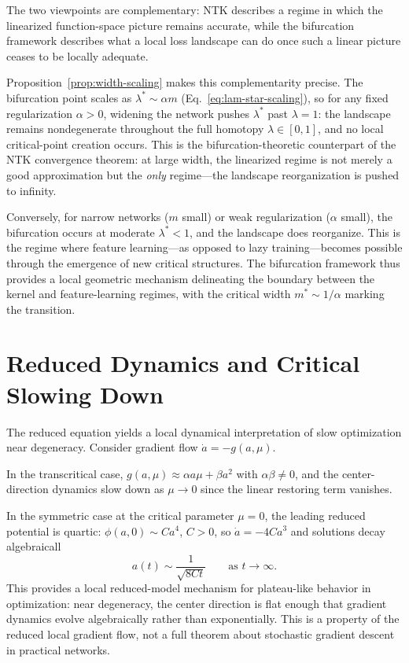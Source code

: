 \documentclass[11pt, reqno]{amsart}
\theoremstyle{plain}
\theoremstyle{definition}
\theoremstyle{remark}
\begin{document}
The two viewpoints are complementary: NTK describes a regime in which the linearized function-space picture remains accurate, while the bifurcation framework describes what a local loss landscape can do once such a linear picture ceases to be locally adequate.

Proposition~\ref{prop:width-scaling} makes this complementarity precise.  The bifurcation point scales as $\lambda^*\sim\alpha m$ (Eq.~\ref{eq:lam-star-scaling}), so for any fixed regularization $\alpha>0$, widening the network pushes $\lambda^*$ past $\lambda=1$: the landscape remains nondegenerate throughout the full homotopy $\lambda\in[0,1]$, and no local critical-point creation occurs.  This is the bifurcation-theoretic counterpart of the NTK convergence theorem: at large width, the linearized regime is not merely a good approximation but the \emph{only} regime---the landscape reorganization is pushed to infinity.

Conversely, for narrow networks ($m$ small) or weak regularization ($\alpha$ small), the bifurcation occurs at moderate $\lambda^*<1$, and the landscape does reorganize.  This is the regime where feature learning---as opposed to lazy training---becomes possible through the emergence of new critical structures.  The bifurcation framework thus provides a local geometric mechanism delineating the boundary between the kernel and feature-learning regimes, with the critical width $m^*\sim 1/\alpha$ marking the transition.

\section{Reduced Dynamics and Critical Slowing Down}\label{sec:dynamics}

The reduced equation yields a local dynamical interpretation of slow optimization near degeneracy. Consider gradient flow $\dot a = -g(a,\mu)$.

In the transcritical case, $g(a,\mu)\approx \alpha a\mu+\beta a^2$ with $\alpha\beta\neq 0$, and the center-direction dynamics slow down as $\mu\to 0$ since the linear restoring term vanishes.

In the symmetric case at the critical parameter $\mu=0$, the leading reduced potential is quartic:
$\phi(a,0)\sim C a^4$, $C>0$,
so $\dot a = -4Ca^3$ and solutions decay algebraicall
\begin{equation}
  a(t)\sim \frac{1}{\sqrt{8Ct}}
  \qquad \text{as } t\to\infty.
\end{equation}
This provides a local reduced-model mechanism for plateau-like behavior in optimization: near degeneracy, the center direction is flat enough that gradient dynamics evolve algebraically rather than exponentially. This is a property of the reduced local gradient flow, not a full theorem about stochastic gradient descent in practical networks.
\end{document}
